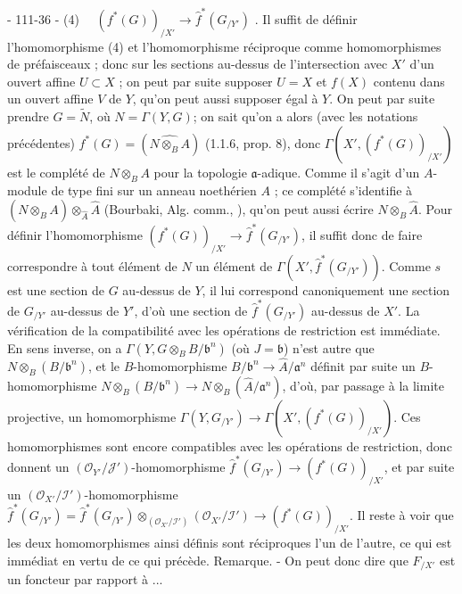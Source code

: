 \newpage


- 111-36 -
(4) $\quad (f^*(G))_{/X'} \to \hat{f}^* (G_{/Y'})$ .
Il suffit de définir l'homomorphisme (4) et l'homomorphisme réciproque comme homomorphismes de préfaisceaux ; donc sur les sections au-dessus de l'intersection avec $X'$ d'un ouvert affine $U \subset X$ ; on peut par suite supposer $U=X$ et $f(X)$ contenu dans un ouvert affine $V$ de $Y$, qu'on peut aussi supposer égal à $Y$. On peut par suite prendre $G=\tilde{N}$, où $N=\Gamma(Y,G)$; on sait qu'on a alors (avec les notations précédentes) $f^*(G) = (\widehat{N \otimes_B A})$ (1.1.6, prop. 8), donc $\Gamma(X', (f^*(G))_{/X'})$ est le complété de $N \otimes_B A$ pour la topologie $\mathfrak{a}$-adique. Comme il s'agit d'un $A$-module de type fini sur un anneau noethérien $A$ ; ce complété s'identifie à $(\widehat{N \otimes_B A}) \otimes_{\hat{A}} \hat{A}$ (Bourbaki, Alg. comm., ), qu'on peut aussi écrire $N \otimes_B \hat{A}$. Pour définir l'homomorphisme $(f^*(G))_{/X'} \to \hat{f}^* (G_{/Y'})$, il suffit donc de faire correspondre à tout élément de $N$ un élément de $\Gamma(X', \hat{f}^* (G_{/Y'}))$. Comme $s$ est une section de $G$ au-dessus de $Y$, il lui correspond canoniquement une section de $G_{/Y'}$ au-dessus de $Y'$, d'où une section de $\hat{f}^* (G_{/Y'})$ au-dessus de $X'$.
La vérification de la compatibilité avec les opérations de restriction est immédiate. En sens inverse, on a $\Gamma(Y, G \otimes_B B/\mathfrak{b}^n)$ (où $J=\mathfrak{b}$) n'est autre que $N \otimes_B (B/\mathfrak{b}^n)$, et le $B$-homomorphisme $B/\mathfrak{b}^n \to \hat{A}/\mathfrak{a}^n$ définit par suite un $B$-homomorphisme $N \otimes_B (B/\mathfrak{b}^n) \to N \otimes_B (\hat{A}/\mathfrak{a}^n)$, d'où, par passage à la limite projective, un homomorphisme $\Gamma(Y, G_{/Y'}) \to \Gamma(X', (f^*(G))_{/X'})$. Ces homomorphismes sont encore compatibles avec les opérations de restriction, donc donnent un $(\mathcal{O}_{Y'}/\mathcal{J'})$-homomorphisme $\hat{f}^* (G_{/Y'}) \to (f^*(G))_{/X'}$, et par suite un $(\mathcal{O}_{X'}/\mathcal{I'})$-homomorphisme $\hat{f}^* (G_{/Y'}) = \hat{f}^* (G_{/Y'}) \otimes_{(\mathcal{O}_{X'}/\mathcal{I'})} (\mathcal{O}_{X'}/\mathcal{I'}) \to (f^*(G))_{/X'}$. Il reste à voir que les deux homomorphismes ainsi définis sont réciproques l'un de l'autre, ce qui est immédiat en vertu de ce qui précède.
Remarque. - On peut donc dire que $F_{/X'}$ est un foncteur par rapport à ...

\newpage


